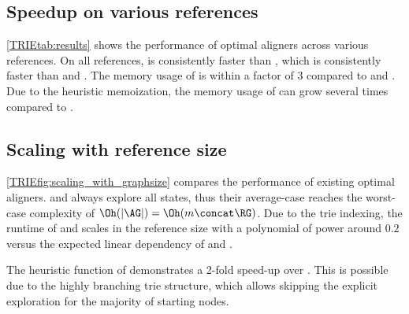 
\subsection{Speedup on various references}
\cref{TRIEtab:results} shows the performance of optimal aligners across various
references. On all references, \astarix is consistently faster than \dijkstra,
which is consistently faster than \pasgal and \bitparallel. The memory usage of
\dijkstra is within a factor of 3 compared to \pasgal and \bitparallel. Due to
the heuristic memoization, the memory usage of \astarix can grow several times
compared to \dijkstra.



\subsection{Scaling with reference size}

\cref{TRIEfig:scaling_with_graphsize} compares the performance of existing optimal
aligners. \bitparallel and \pasgal always explore all states, thus their
average-case reaches the worst-case complexity of $\Oh(\lvert \AG \rvert) =
\Oh(m \concat \RG)$. Due to the trie indexing, the runtime of \astarix and
\dijkstra scales in the reference size with a polynomial of power around $0.2$
versus the expected linear dependency of \bitparallel and \pasgal.

The heuristic function of \astarix demonstrates a 2-fold speed-up over
\dijkstra. This is possible due to the highly branching trie structure, which
allows skipping the explicit exploration for the majority of starting nodes. 

